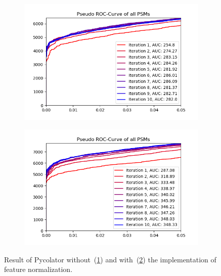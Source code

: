 \begin{figure}
	\normalsize
	\centering
	\begin{subfigure}{0.49\textwidth}
		\includegraphics[width = \textwidth]{figures/noNorming.png}
		\caption{}
		\label{fig:before_feature_normalization}
	\end{subfigure}
	\hfill
	\begin{subfigure}{0.49\textwidth}
		\includegraphics[width = \textwidth]{figures/norming.png}
		\caption{}
		\label{fig:after_feature_normalization}
	\end{subfigure}
	\caption[Results of feature normalization]{Result of Pycolator without~(\ref{fig:before_feature_normalization}) and with~(\ref{fig:after_feature_normalization}) the implementation of feature normalization. }
	\label{fig:feature_normalization}
\end{figure}
\renewcommand{\baselinestretch}{1}


